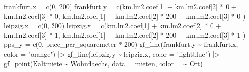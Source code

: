 \documentclass[
  a4paper,
  DIV=11]{scrartcl}
\newenvironment{Shaded}{\begin{snugshade}}{\end{snugshade}}
\newcommand{\AttributeTok}[1]{\textcolor[rgb]{0.40,0.45,0.13}{#1}}
\newcommand{\DecValTok}[1]{\textcolor[rgb]{0.68,0.00,0.00}{#1}}
\newcommand{\FunctionTok}[1]{\textcolor[rgb]{0.28,0.35,0.67}{#1}}
\newcommand{\NormalTok}[1]{\textcolor[rgb]{0.00,0.23,0.31}{#1}}
\newcommand{\OtherTok}[1]{\textcolor[rgb]{0.00,0.23,0.31}{#1}}
\newcommand{\SpecialCharTok}[1]{\textcolor[rgb]{0.37,0.37,0.37}{#1}}
\newcommand{\StringTok}[1]{\textcolor[rgb]{0.13,0.47,0.30}{#1}}
\begin{document}
\begin{Shaded}
\begin{Highlighting}[]
\NormalTok{frankfurt.x }\OtherTok{=} \FunctionTok{c}\NormalTok{(}\DecValTok{0}\NormalTok{, }\DecValTok{200}\NormalTok{)}
\NormalTok{frankfurt.y }\OtherTok{=} \FunctionTok{c}\NormalTok{(km.lm2.coef[}\DecValTok{1}\NormalTok{] }\SpecialCharTok{+}\NormalTok{ km.lm2.coef[}\DecValTok{2}\NormalTok{] }\SpecialCharTok{*} \DecValTok{0} \SpecialCharTok{+}\NormalTok{ km.lm2.coef[}\DecValTok{3}\NormalTok{] }\SpecialCharTok{*} \DecValTok{0}\NormalTok{, km.lm2.coef[}\DecValTok{1}\NormalTok{] }\SpecialCharTok{+}\NormalTok{ km.lm2.coef[}\DecValTok{2}\NormalTok{] }\SpecialCharTok{*} \DecValTok{200} \SpecialCharTok{+}\NormalTok{ km.lm2.coef[}\DecValTok{3}\NormalTok{] }\SpecialCharTok{*} \DecValTok{0}\NormalTok{ )}
\NormalTok{leipzig.x }\OtherTok{=} \FunctionTok{c}\NormalTok{(}\DecValTok{0}\NormalTok{, }\DecValTok{200}\NormalTok{)}
\NormalTok{leipzig.y }\OtherTok{=} \FunctionTok{c}\NormalTok{(km.lm2.coef[}\DecValTok{1}\NormalTok{] }\SpecialCharTok{+}\NormalTok{ km.lm2.coef[}\DecValTok{2}\NormalTok{] }\SpecialCharTok{*} \DecValTok{0} \SpecialCharTok{+}\NormalTok{ km.lm2.coef[}\DecValTok{3}\NormalTok{] }\SpecialCharTok{*} \DecValTok{1}\NormalTok{, km.lm2.coef[}\DecValTok{1}\NormalTok{] }\SpecialCharTok{+}\NormalTok{ km.lm2.coef[}\DecValTok{2}\NormalTok{] }\SpecialCharTok{*} \DecValTok{200} \SpecialCharTok{+}\NormalTok{ km.lm2.coef[}\DecValTok{3}\NormalTok{] }\SpecialCharTok{*} \DecValTok{1}\NormalTok{ )}
\NormalTok{pps\_y }\OtherTok{=} \FunctionTok{c}\NormalTok{(}\DecValTok{0}\NormalTok{, price\_per\_squaremeter }\SpecialCharTok{*} \DecValTok{200}\NormalTok{)}
\FunctionTok{gf\_line}\NormalTok{(frankfurt.y }\SpecialCharTok{\textasciitilde{}}\NormalTok{ frankfurt.x, }\AttributeTok{color =} \StringTok{"orange"}\NormalTok{) }\SpecialCharTok{|\textgreater{}} 
  \FunctionTok{gf\_line}\NormalTok{(leipzig.y }\SpecialCharTok{\textasciitilde{}}\NormalTok{ leipzig.x, }\AttributeTok{color =} \StringTok{"lightblue"}\NormalTok{) }\SpecialCharTok{|\textgreater{}}
  \FunctionTok{gf\_point}\NormalTok{(Kaltmiete }\SpecialCharTok{\textasciitilde{}}\NormalTok{ Wohnflaeche, }\AttributeTok{data =}\NormalTok{ mieten, }\AttributeTok{color =} \SpecialCharTok{\textasciitilde{}}\NormalTok{ Ort)}
\end{Highlighting}
\end{Shaded}
\end{document}
